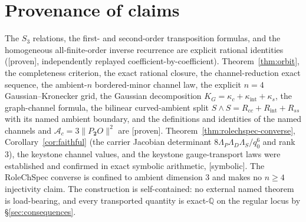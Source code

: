 \documentclass[11pt]{article}
\newcommand{\Proven}{\textsf{[proven]}}
\newcommand{\Symbolic}{\textsf{[symbolic]}}
\theoremstyle{plain}
\theoremstyle{definition}
\newcommand{\KG}{K_{G}}
\newcommand{\Ac}{\mathcal{A}_c}
\newcommand{\kc}{\kappa_{c}}
\newcommand{\kint}{\kappa_{\mathrm{int}}}
\newcommand{\ks}{\kappa_{s}}
\begin{document}
\section*{Provenance of claims}

The $S_3$ relations, the first- and second-order transposition formulas, and the homogeneous
all-finite-order inverse recurrence are explicit rational identities (\Proven, independently replayed
coefficient-by-coefficient). Theorem~\ref{thm:orbit}, the completeness criterion,
the exact rational closure, the channel-reduction exact sequence, the ambient-$n$ bordered-minor
channel law, the explicit $n=4$ Gaussian--Kronecker grid, the Gaussian decomposition
$\KG=\kc+\kint+\ks$, the graph-channel formula, the bilinear curved-ambient split
$S\wedge S=R_{cc}+R_{\mathrm{int}}+R_{ss}$ with its named ambient boundary, and the definitions and
identities of the named channels and $\Ac=3\lVert P_{\mathbf 2}O\rVert^2$ are \Proven.
Theorem~\ref{thm:rolechspec-converse}, Corollary~\ref{cor:faithful} (the carrier Jacobian determinant
$8\Lambda_P\Lambda_D\Lambda_S/q_0^6$ and rank $3$), the keystone channel values, and the keystone
gauge-transport laws were established and confirmed in exact symbolic arithmetic, \Symbolic. The
RoleChSpec converse is confined to ambient dimension $3$ and makes no $n\ge4$ injectivity claim. The
construction is self-contained: no external
named theorem is load-bearing, and every transported quantity is exact-$\mathbb Q$ on the regular
locus by \S\ref{sec:consequences}.
\end{document}
